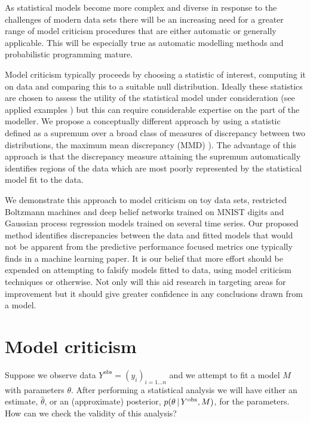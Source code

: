 As statistical models become more complex and diverse in response to the challenges of modern data sets there will be an increasing need for a greater range of model criticism procedures that are either automatic or generally applicable.
This will be especially true as automatic modelling methods \citep[e.g.][]{Grosse2012-zi, Thornton2013-zg, Lloyd2014-nz} and probabilistic programming \citep[e.g.][]{Milch2005-qc, Goodman2008-ok, Stan_Development_Team2014-ha} mature.

Model criticism typically proceeds by choosing a statistic of interest, computing it on data and comparing this to a suitable null distribution.
Ideally these statistics are chosen to assess the utility of the statistical model under consideration (see applied examples \citep[e.g.][]{Meulders1998-xo, Gelman2013-st}) but this can require considerable expertise on the part of the modeller.
We propose a conceptually different approach by using a statistic defined as a supremum over a broad class of measures of discrepancy between two distributions, the maximum mean discrepancy (MMD) \citep[e.g.][]{Borgwardt2006-gy, Gretton2008-gs}).
The advantage of this approach is that the discrepancy measure attaining the supremum automatically identifies regions of the data which are most poorly represented by the statistical model fit to the data.

We demonstrate this approach to model criticism on toy data sets, restricted Boltzmann machines and deep belief networks trained on MNIST digits and Gaussian process \citep[e.g.][]{Rasmussen2006-ml} regression models trained on several time series.
Our proposed method identifies discrepancies between the data and fitted models that would not be apparent from the predictive performance focused metrics one typically finds in a machine learning paper.
It is our belief that more effort should be expended on attempting to falsify models fitted to data, using model criticism techniques or otherwise.
Not only will this aid research in targeting areas for improvement but it should give greater confidence in any conclusions drawn from a model.

\section{Model criticism}
\label{sec:model-crit-general}

Suppose we observe data $Y^\textrm{obs} = (y_i)_{i=1\ldots n}$ and we attempt to fit a model $M$ with parameters $\theta$.
After performing a statistical analysis we will have either an estimate, $\hat\theta$, or an (approximate) posterior, $p(\theta \,|\, Y^\textrm{obs}, M)$, for the parameters.
How can we check the validity of this analysis?

